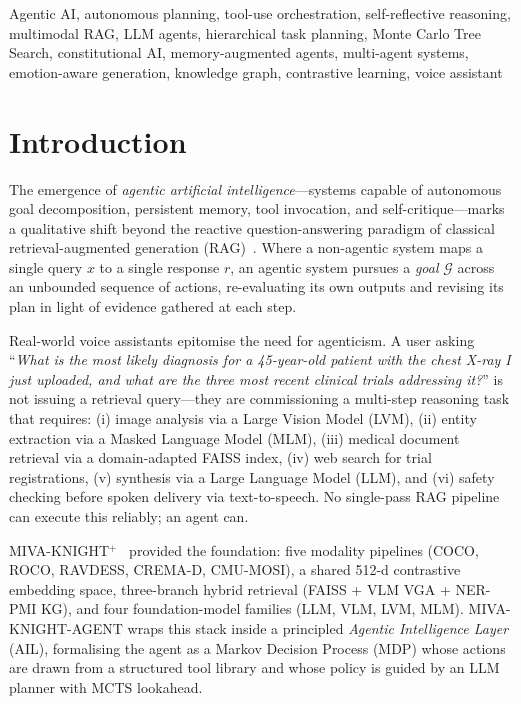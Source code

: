 \documentclass[10pt,conference]{IEEEtran}
\theoremstyle{ieeethm}
\theoremstyle{ieeedef}
\theoremstyle{ieeeremark}
\begin{document}
\begin{IEEEkeywords}
Agentic AI, autonomous planning, tool-use orchestration, self-reflective reasoning, multimodal RAG, LLM agents, hierarchical task planning, Monte Carlo Tree Search, constitutional AI, memory-augmented agents, multi-agent systems, emotion-aware generation, knowledge graph, contrastive learning, voice assistant
\end{IEEEkeywords}

\section{Introduction}
\label{sec:intro}

The emergence of \emph{agentic artificial intelligence}---systems capable of autonomous goal decomposition, persistent memory, tool invocation, and self-critique---marks a qualitative shift beyond the reactive question-answering paradigm of classical retrieval-augmented generation (RAG)~\cite{lewis2020retrieval}. Where a non-agentic system maps a single query $x$ to a single response $r$, an agentic system pursues a \emph{goal} $\mathcal{G}$ across an unbounded sequence of actions, re-evaluating its own outputs and revising its plan in light of evidence gathered at each step.

Real-world voice assistants epitomise the need for agenticism. A user asking ``\emph{What is the most likely diagnosis for a 45-year-old patient with the chest X-ray I just uploaded, and what are the three most recent clinical trials addressing it?}'' is not issuing a retrieval query---they are commissioning a multi-step reasoning task that requires: (i) image analysis via a Large Vision Model (LVM), (ii) entity extraction via a Masked Language Model (MLM), (iii) medical document retrieval via a domain-adapted FAISS index, (iv) web search for trial registrations, (v) synthesis via a Large Language Model (LLM), and (vi) safety checking before spoken delivery via text-to-speech. No single-pass RAG pipeline can execute this reliably; an agent can.

\textsc{MIVA-KNIGHT}$^+$~\cite{soyinka2024mivaplus} provided the foundation: five modality pipelines (COCO, ROCO, RAVDESS, CREMA-D, CMU-MOSI), a shared 512-d contrastive embedding space, three-branch hybrid retrieval (FAISS + VLM VGA + NER-PMI KG), and four foundation-model families (LLM, VLM, LVM, MLM). \textsc{MIVA-KNIGHT-AGENT} wraps this stack inside a principled \emph{Agentic Intelligence Layer} (AIL), formalising the agent as a Markov Decision Process (MDP) whose actions are drawn from a structured tool library and whose policy is guided by an LLM planner with MCTS lookahead.
\end{document}
